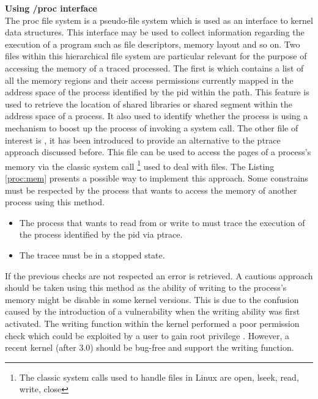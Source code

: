\textbf{ Using /proc interface} \\
The proc file system is a pseudo-file system which is used as an interface to kernel data structures. This interface may be used to collect information regarding the execution of a program such as file descriptors, memory layout and so on. Two files within this hierarchical file system are particular relevant for the purpose of accessing the memory of a traced processed. The first is  which contains a list of all the memory regions and their access permissions currently mapped in the address space of the process identified by the pid within the path. This feature is used to retrieve the location of shared libraries or shared segment within the address space of a process. It also used to identify whether the process is using a  mechanism to boost up the process of invoking a system call. The other file of interest is , it has been introduced to provide an alternative to the ptrace approach discussed before. This file can be used to access the pages of a process's memory via the classic system call  \footnote{The classic system calls used to handle files in Linux are open, lseek, read, write, close} used to deal with files. The Listing \ref{proc:mem} presents a possible way to implement this approach. Some constrains must be respected by the process that wants to access the memory of another process using this method.
\begin{itemize}
\item  The process that wants to read from or write to  must trace the execution of the process identified by the pid via ptrace.
\item  The tracee must be in a stopped state.  
\end{itemize} 
If the previous checks are not respected an  error is retrieved. A cautious approach should be taken using this method as the ability of writing to the process's memory might be disable in some kernel versions. This is due to the confusion caused by the introduction of a vulnerability when the writing ability was first activated. The writing function within the kernel performed a poor permission check which could be exploited by a user to gain root privilege \cite{mem_vul}. However, a recent kernel (after 3.0) should be bug-free and support the writing function. 


